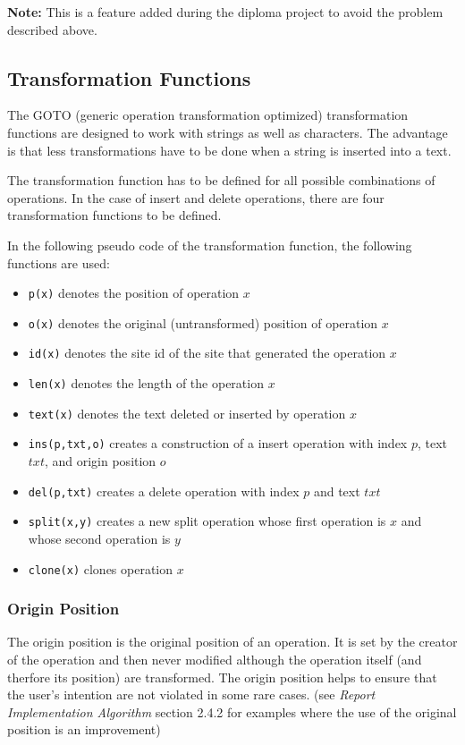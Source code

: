 \textbf{Note:} This is a feature added during the diploma project to
avoid the problem described above.




\subsection{Transformation Functions}
The GOTO (generic operation transformation optimized) transformation functions 
are designed to work with strings as well as characters. The advantage is that 
less transformations have to be done when a string is inserted into a text. 

The transformation function has to be defined for all possible combinations
of operations. In the case of insert and delete operations, there are four
transformation functions to be defined.

In the following pseudo code of the transformation function, the following
functions are used:
\begin{itemize}
 \item \texttt{p(x)} denotes the position of operation $x$
 \item \texttt{o(x)} denotes the original (untransformed) position of operation $x$
 \item \texttt{id(x)} denotes the site id of the site that generated the operation $x$
 \item \texttt{len(x)} denotes the length of the operation $x$
 \item \texttt{text(x)} denotes the text deleted or inserted by operation $x$
 \item \texttt{ins(p,txt,o)} creates a construction of a insert operation with index $p$, text $txt$, and origin position $o$
 \item \texttt{del(p,txt)} creates a delete operation with index $p$ and text $txt$
 \item \texttt{split(x,y)} creates a new split operation whose first operation is $x$ and whose second operation is $y$
 \item \texttt{clone(x)} clones operation $x$
\end{itemize}


\subsubsection{Origin Position}
The origin position is the original position of an operation. It is set by
the creator of the operation and then never modified although the operation
itself (and therfore its position) are transformed. The origin position 
helps to ensure that the user's intention are not violated in some rare
cases. (see \emph{Report Implementation Algorithm} section 2.4.2 for 
examples where the use of the original position is an improvement)


